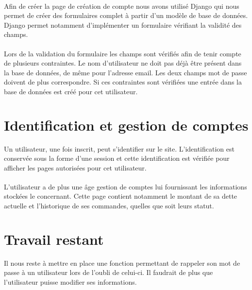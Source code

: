 \documentclass[twoside,UTF8]{EPURapport}
\begin{document}
        \paragraph{}Afin de créer la page de création de compte nous avons utilisé Django qui nous permet de créer des formulaires complet à partir d'un modèle de base de données. Django permet notamment d'implémenter un formulaire vérifiant la validité des champs.

        \paragraph{}Lors de la validation du formulaire les champs sont vérifiés afin de tenir compte de plusieurs contraintes. Le nom d'utilisateur ne doit pas déjà être présent dans la base de données, de même pour l'adresse email. Les deux champs mot de passe doivent de plus correspondre. Si ces contraintes sont vérifiées une entrée dans la base de données est créé pour cet utilisateur.

    \section{Identification et gestion de comptes}

        \paragraph{}Un utilisateur, une fois inscrit, peut s'identifier sur le site. L'identification est conservée sous la forme d'une session et cette identification est vérifiée pour afficher les pages autorisées pour cet utilisateur.

        \paragraph{}L'utilisateur a de plus une âge gestion de comptes lui fournissant les informations stockées le
concernant. Cette page contient notamment le montant de sa dette actuelle et l'historique de ses commandes, quelles que
soit leurs statut.

    \section{Travail restant}
        
        \paragraph{}Il nous reste à mettre en place une fonction permettant de rappeler son mot de passe à un utilisateur lors de l'oubli de celui-ci. Il faudrait de plus que l'utilisateur puisse modifier ses informations.
\end{document}
